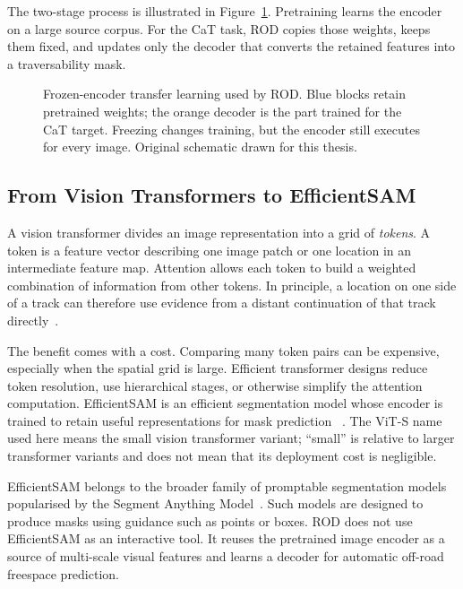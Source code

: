 The two-stage process is illustrated in
Figure~\ref{fig:frozen_transfer_learning}. Pretraining learns the encoder on a
large source corpus. For the CaT task, ROD copies those weights, keeps them
fixed, and updates only the decoder that converts the retained features into a
traversability mask.

\begin{figure}[H]
\centering
\resizebox{0.95\textwidth}{!}{}
\caption[Frozen-encoder transfer learning used by ROD.]{Frozen-encoder transfer
learning used by ROD. Blue blocks retain pretrained weights; the orange
decoder is the part trained for the CaT target. Freezing changes training, but
the encoder still executes for every image. Original schematic drawn for this
thesis.}
\label{fig:frozen_transfer_learning}
\end{figure}

\subsection{From Vision Transformers to EfficientSAM}

A vision transformer divides an image representation into a grid of
\emph{tokens}. A token is a feature vector describing one image patch or one
location in an intermediate feature map. Attention allows each token to build
a weighted combination of information from other tokens. In principle, a
location on one side of a track can therefore use evidence from a distant
continuation of that track directly~\cite{dosovitskiy2021vit}.

The benefit comes with a cost. Comparing many token pairs can be expensive,
especially when the spatial grid is large. Efficient transformer designs
reduce token resolution, use hierarchical stages, or otherwise simplify the
attention computation. EfficientSAM is an efficient segmentation model whose
encoder is trained to retain useful representations for mask prediction
~\cite{xiong2024efficientsam}. The ViT-S name used here means the small vision
transformer variant; ``small'' is relative to larger transformer variants and
does not mean that its deployment cost is negligible.

EfficientSAM belongs to the broader family of promptable segmentation models
popularised by the Segment Anything Model~\cite{kirillov2023sam}. Such models
are designed to produce masks using guidance such as points or boxes. ROD does
not use EfficientSAM as an interactive tool. It reuses the
pretrained image encoder as a source of multi-scale visual features and learns
a decoder for automatic off-road freespace prediction.

